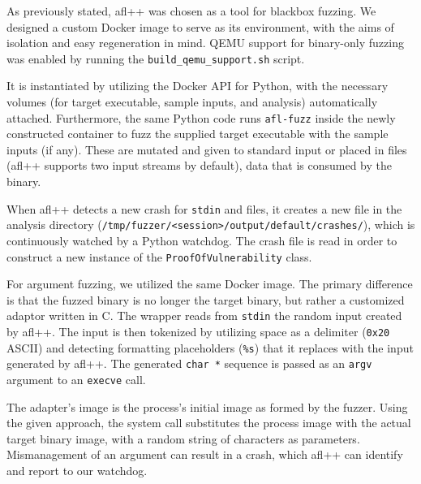 \documentclass[../main.tex]{subfiles}
\begin{document}
As previously stated, afl++ was chosen as a tool for blackbox fuzzing. We
designed a custom Docker image to serve as its environment, with the aims of
isolation and easy regeneration in mind. QEMU support for binary-only fuzzing
was enabled by running the \texttt{build\_qemu\_support.sh} script.

It is instantiated by utilizing the Docker API for Python, with the necessary
volumes (for target executable, sample inputs, and analysis) automatically
attached. Furthermore, the same Python code runs \texttt{afl-fuzz} inside the
newly constructed container to fuzz the supplied target executable with the
sample inputs (if any). These are mutated and given to standard input or placed
in files (afl++ supports two input streams by default), data that is consumed
by the binary.

When afl++ detects a new crash for \texttt{stdin} and files, it creates a new
file in the analysis directory
(\texttt{/tmp/fuzzer/<session>/output/default/crashes/}), which is continuously
watched by a Python watchdog. The crash file is read in order to construct a
new instance of the \texttt{ProofOfVulnerability} class.

For argument fuzzing, we utilized the same Docker image. The primary difference
is that the fuzzed binary is no longer the target binary, but rather a
customized adaptor written in C. The wrapper reads from \texttt{stdin} the
random input created by afl++. The input is then tokenized by utilizing space
as a delimiter (\texttt{0x20} ASCII) and detecting formatting placeholders
(\texttt{\%s}) that it replaces with the input generated by afl++. The
generated \texttt{char\ *} sequence is passed as an \texttt{argv} argument to
an \texttt{execve} call.

The adapter's image is the process's initial image as formed by the fuzzer.
Using the given approach, the system call substitutes the process image with
the actual target binary image, with a random string of characters as
parameters. Mismanagement of an argument can result in a crash, which afl++ can
identify and report to our watchdog.
\end{document}

